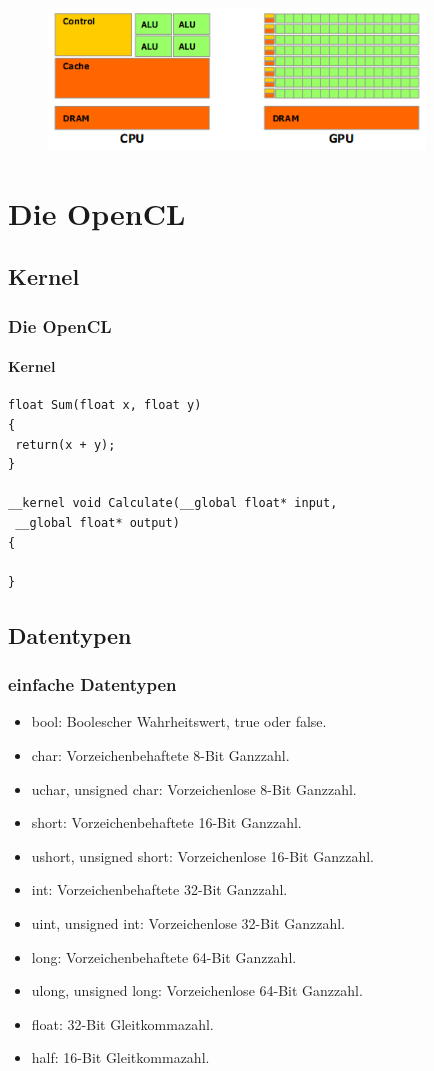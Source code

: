 \documentclass{beamer}
\begin{document}
\begin{frame}[fragile]
\begin{figure}
\begin{center}
\includegraphics[width=10cm]{cpu_gpu.png}
\end{center}
\end{figure}
\end{frame}

\section{Die OpenCL}
\subsection{Kernel}
\begin{frame}[fragile]
\frametitle{Die OpenCL}
\framesubtitle{Kernel}
\begin{lstlisting}
float Sum(float x, float y)
{
 return(x + y);
}

__kernel void Calculate(__global float* input,
 __global float* output)
{
 
}
\end{lstlisting}
\end{frame}

\subsection{Datentypen}
\begin{frame}[fragile]
\frametitle{einfache Datentypen}
\begin{itemize}

\item bool: Boolescher Wahrheitswert, true oder false.
\item char: Vorzeichenbehaftete 8-Bit Ganzzahl.
\item uchar, unsigned char: Vorzeichenlose 8-Bit Ganzzahl.
\item short: Vorzeichenbehaftete 16-Bit Ganzzahl.
\item ushort, unsigned short: Vorzeichenlose 16-Bit Ganzzahl.
\item int: Vorzeichenbehaftete 32-Bit Ganzzahl.
\item uint, unsigned int: Vorzeichenlose 32-Bit Ganzzahl.
\item long: Vorzeichenbehaftete 64-Bit Ganzzahl.
\item ulong, unsigned long: Vorzeichenlose 64-Bit Ganzzahl.
\item float: 32-Bit Gleitkommazahl.
\item half: 16-Bit Gleitkommazahl.

\end{itemize}
\end{frame}
\end{document}
